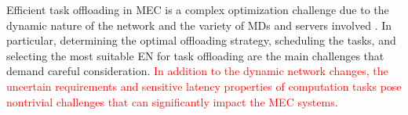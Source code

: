 \documentclass[10pt, journal,letterpaper]{IEEEtran}
\begin{document}
Efficient task offloading in MEC is a complex optimization challenge due to the dynamic nature of the network and the variety of MDs and servers involved \cite{jiang2019toward} \cite{TNSE-WU-24}. In particular, determining the optimal offloading strategy, scheduling the tasks, and selecting the most suitable EN for task offloading are the main challenges that demand careful consideration. \textcolor{red}{In addition to the dynamic network changes, the uncertain requirements and sensitive latency properties of computation tasks pose nontrivial challenges that can significantly impact the MEC systems.}


\end{document}
